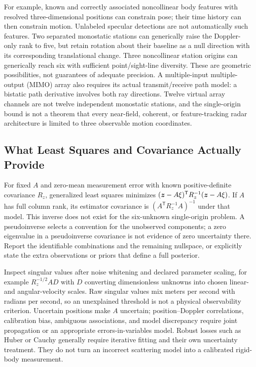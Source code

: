 For example, known and correctly associated noncollinear body features with resolved three-dimensional positions can constrain pose; their time history can then constrain motion.
Unlabeled specular detections are not automatically such features.
Two separated monostatic stations can generically raise the Doppler-only rank to five, but retain rotation about their baseline as a null direction with its corresponding translational change.
Three noncollinear station origins can generically reach six with sufficient point/sight-line diversity.
These are geometric possibilities, not guarantees of adequate precision.
A multiple-input multiple-output (MIMO) array also requires its actual transmit/receive path model: a bistatic path derivative involves both ray directions.
Twelve virtual array channels are not twelve independent monostatic stations, and the single-origin bound is not a theorem that every near-field, coherent, or feature-tracking radar architecture is limited to three observable motion coordinates.

\subsection{What Least Squares and Covariance Actually Provide}

For fixed $A$ and zero-mean measurement error with known positive-definite covariance $R_z$, generalized least squares minimizes $(\bm{z}-A\xi)^{\mathsf T}R_z^{-1}(\bm{z}-A\xi)$.
If $A$ has full column rank, its estimator covariance is $(A^{\mathsf T}R_z^{-1}A)^{-1}$ under that model.
This inverse does not exist for the six-unknown single-origin problem.
A pseudoinverse selects a convention for the unobserved components; a zero eigenvalue in a pseudoinverse covariance is not evidence of zero uncertainty there.
Report the identifiable combinations and the remaining nullspace, or explicitly state the extra observations or priors that define a full posterior.

Inspect singular values after noise whitening and declared parameter scaling, for example $R_z^{-1/2}AD$ with $D$ converting dimensionless unknowns into chosen linear- and angular-velocity scales.
Raw singular values mix meters per second with radians per second, so an unexplained threshold is not a physical observability criterion.
Uncertain positions make $A$ uncertain; position--Doppler correlations, calibration bias, ambiguous associations, and model discrepancy require joint propagation or an appropriate errors-in-variables model.
Robust losses such as Huber or Cauchy generally require iterative fitting and their own uncertainty treatment.
They do not turn an incorrect scattering model into a calibrated rigid-body measurement.

